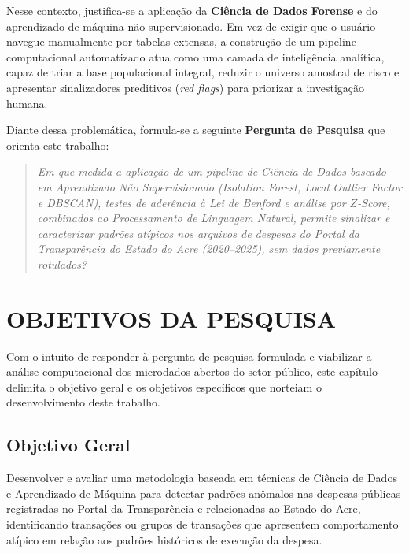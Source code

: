 \documentclass[
    12pt,               %
    openright,          %
    oneside,            %
    a4paper,            %
    chapter=TITLE,      %
    sumario=tradicional,%
    english,            %
    brazilian,          %
 ]{abntex2}
\begin{document}
Nesse contexto, justifica-se a aplicação da \textbf{Ciência de Dados Forense} e do aprendizado de máquina não supervisionado. Em vez de exigir que o usuário navegue manualmente por tabelas extensas, a construção de um pipeline computacional automatizado atua como uma camada de inteligência analítica, capaz de triar a base populacional integral, reduzir o universo amostral de risco e apresentar sinalizadores preditivos (\textit{red flags}) para priorizar a investigação humana.

Diante dessa problemática, formula-se a seguinte \textbf{Pergunta de Pesquisa} que orienta este trabalho:\begin{quote}
\textit{Em que medida a aplicação de um pipeline de Ciência de Dados baseado em Aprendizado Não Supervisionado (\textit{Isolation Forest}, \textit{Local Outlier Factor} e \textit{DBSCAN}), testes de aderência à Lei de Benford e análise por $Z$-Score, combinados ao Processamento de Linguagem Natural, permite sinalizar e caracterizar padrões atípicos nos arquivos de despesas do Portal da Transparência do Estado do Acre (2020--2025), sem dados previamente rotulados?}
\end{quote}

\chapter{OBJETIVOS DA PESQUISA}\label{sec:objetivos}
Com o intuito de responder à pergunta de pesquisa formulada e viabilizar a análise computacional dos microdados abertos do setor público, este capítulo delimita o objetivo geral e os objetivos específicos que norteiam o desenvolvimento deste trabalho.

\section{Objetivo Geral}\label{sec:objetivo_geral}
Desenvolver e avaliar uma metodologia baseada em técnicas de Ciência de Dados e Aprendizado de Máquina para detectar padrões anômalos nas despesas públicas registradas no Portal da Transparência e relacionadas ao Estado do Acre, identificando transações ou grupos de transações que apresentem comportamento atípico em relação aos padrões históricos de execução da despesa.
\end{document}
